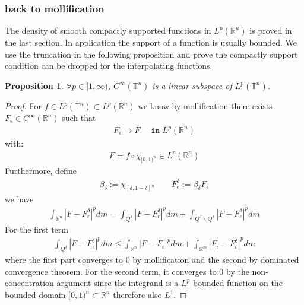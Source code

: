 \documentclass[a4paper,11pt,fleqn]{book}
\newtheorem{proposition}[theorem]{Proposition}
\theoremstyle{definition}
\theoremstyle{remark}
\begin{document}
\subsubsection{back to mollification}
The density of smooth compactly supported functions in $L^p(\mathbb{R}^n)$ is proved in the last section. In application the support of a function is usually bounded. We use the truncation in the following proposition and prove the compactly support condition can be dropped for the interpolating functions. 
\begin{proposition}
	$\forall p \in [1, \infty)$, $C^\infty(\mathbb{T}^n)$ is a linear subspace of $L^p(\mathbb{T}^n)$.
\end{proposition}
\begin{proof}
For $f \in L^p(\mathbb{T}^n) \subset L^p(\mathbb{R}^n)$ we know by mollification there exists $F_\epsilon \in C^\infty(\mathbb{R}^n)$ such that
\begin{align*}
	F_\epsilon \rightarrow F \quad \texttt{ in } L^p(\mathbb{R}^n)
\end{align*}
with:
\begin{align*}
	F = f \circ \chi_{[0, 1)^n} \in L^p(\mathbb{R}^n)
\end{align*}
Furthermore, define 
\begin{align*}
	\beta_\delta := \chi_{[\delta, 1 - \delta]^n} \qquad F_\epsilon^\delta := \beta_\delta F_\epsilon
\end{align*}
we have
\begin{align*}
	\int_{\mathbb{R}^n} | F - F_\epsilon^\delta|^p dm 
	= \int_{Q^\delta} | F - F^\delta_\epsilon|^p dm + \int_{Q^\delta \backslash Q^\delta}|F - F^\delta_\epsilon|^p dm 
\end{align*}
For the first term
\begin{align*}
	\int_{Q^\delta} | F - F^\delta_\epsilon|^p dm 
	\le \int_{\mathbb{R}^n} | F - F_\epsilon|^p dm + \int_{\mathbb{R}^m} | F_\epsilon - F_\epsilon^\delta|^p dm 
\end{align*}
where the first part converges to 0 by mollification and the second by dominated convergence theorem. For the second term, it converges to 0 by the non-concentration argument since the integrand is a $L^p$ bounded function on the bounded domain $[0, 1)^n \subset \mathbb{R}^n$ therefore also $L^1$. 
\end{proof}
\end{document}

